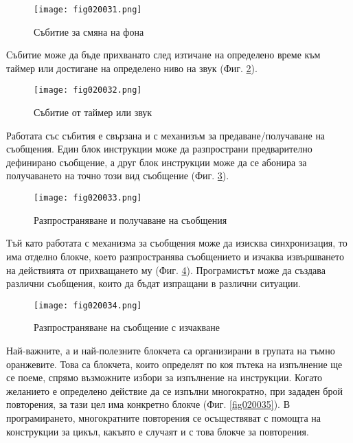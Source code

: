\begin{figure}[H]
  \centering
  \texttt{[image: fig020031.png]}
  \caption{Събитие за смяна на фона}
\label{fig020031}
\end{figure}

Събитие може да бъде прихванато след изтичане на определено време към таймер или достигане на определено ниво на звук (Фиг. \ref{fig020032}).

\begin{figure}[H]
  \centering
  \texttt{[image: fig020032.png]}
  \caption{Събитие от таймер или звук}
\label{fig020032}
\end{figure}

Работата със събития е свързана и с механизъм за предаване/получаване на съобщения. Един блок инструкции може да разпространи предварително дефинирано съобщение, а друг блок инструкции може да се абонира за получаването на точно този вид съобщение (Фиг. \ref{fig020033}).

\begin{figure}[H]
  \centering
  \texttt{[image: fig020033.png]}
  \caption{Разпространяване и получаване на съобщения}
\label{fig020033}
\end{figure}

Тъй като работата с механизма за съобщения може да изисква синхронизация, то има отделно блокче, което разпространява съобщението и изчаква извършването на действията от прихващането му (Фиг. \ref{fig020034}). Програмистът може да създава различни съобщения, които да бъдат изпращани в различни ситуации. 

\begin{figure}[H]
  \centering
  \texttt{[image: fig020034.png]}
  \caption{Разпространяване на съобщение с изчакване}
\label{fig020034}
\end{figure}

Най-важните, а и най-полезните блокчета са организирани в групата на тъмно оранжевите. Това са блокчета, които определят по коя пътека на изпълнение ще се поеме, спрямо възможните избори за изпълнение на инструкции. Когато желанието е определено действие да се изпълни многократно, при зададен брой повторения, за тази цел има конкретно блокче (Фиг. \ref{fig020035}). В програмирането, многократните повторения се осъществяват с помощта на конструкции за цикъл, какъвто е случаят и с това блокче за повторения.

